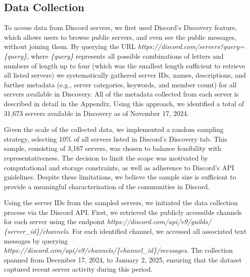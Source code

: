 \subsection{Data Collection}
\label{data-collection}
To access data from Discord servers, we first used Discord's Discovery feature, which allows users to browse public servers, and even see the public messages, without joining them. By querying the URL \textit{https://discord.com/servers?query=\{query\}}, where \textit{\{query\}} represents all possible combinations of letters and numbers of length up to four (which was the smallest length sufficient to retrieve all listed servers)
we systematically gathered server IDs, names, descriptions, and further metadata (e.g., server categories, keywords, and member count) for all servers available in Discovery. All of the metadata collected from each server is described in detail in the Appendix. Using this approach, we identified a total of 31,673 servers available in Discovery as of November 17, 2024.


Given the scale of the collected data, we implemented a random sampling strategy, selecting 10\% of all servers listed in Discord's Discovery tab. This sample, consisting of 3,167 servers, was chosen to balance feasibility with representativeness. The decision to limit the scope was motivated by computational and storage constraints, as well as adherence to Discord's API guidelines. Despite these limitations, we believe the sample size is sufficient to provide a meaningful characterization of the communities in Discord.

Using the server IDs from the sampled servers, we initiated the data collection process via the Discord API. First, we retrieved the publicly accessible channels for each server using the endpoint \textit{https://discord.com/api/v9/guilds/ \{server\_id\}/channels}. For each identified channel, we accessed all associated text messages by querying \textit{https://discord.com/api/v9/channels/\{channel\_id\}/messages}. The collection spanned from December 17, 2024, to January 2, 2025, ensuring that the dataset captured recent server activity during this period.

